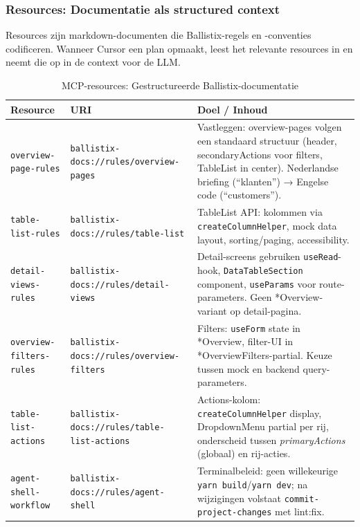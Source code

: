 \subsubsection{Resources: Documentatie als structured context}

Resources zijn markdown-documenten die Ballistix-regels en -conventies codificeren. Wanneer Cursor een plan opmaakt, leest het relevante resources in en neemt die op in de context voor de LLM.

\begin{table}[htbp]
  \centering
  \caption{MCP-resources: Gestructureerde Ballistix-documentatie}
  \label{tab:mcp-resources}
  \small
  \begin{tabularx}{\textwidth}{|l|l|X|}
    \hline
    \textbf{Resource} & \textbf{URI} & \textbf{Doel / Inhoud} \\
    \hline
    \texttt{overview-page-rules} & 
    \texttt{ballistix-docs://rules/overview-pages} &
    Vastleggen: overview-pages volgen een standaard structuur (header, secondaryActions voor filters, TableList in center). Nederlandse briefing (``klanten'') → Engelse code (``customers''). \\
    \hline
    \texttt{table-list-rules} &
    \texttt{ballistix-docs://rules/table-list} &
    TableList API: kolommen via \texttt{createColumnHelper}, mock data layout, sorting/paging, accessibility. \\
    \hline
    \texttt{detail-views-rules} &
    \texttt{ballistix-docs://rules/detail-views} &
    Detail-screens gebruiken \texttt{useRead}-hook, \texttt{DataTableSection} component, \texttt{useParams} voor route-parameters. Geen *Overview-variant op detail-pagina. \\
    \hline
    \texttt{overview-filters-rules} &
    \texttt{ballistix-docs://rules/overview-filters} &
    Filters: \texttt{useForm} state in *Overview, filter-UI in *OverviewFilters-partial. Keuze tussen mock en backend query-parameters. \\
    \hline
    \texttt{table-list-actions} &
    \texttt{ballistix-docs://rules/table-list-actions} &
    Actions-kolom: \texttt{createColumnHelper} display, DropdownMenu partial per rij, onderscheid tussen \textit{primaryActions} (globaal) en rij-acties. \\
    \hline
    \texttt{agent-shell-workflow} &
    \texttt{ballistix-docs://rules/agent-shell} &
    Terminalbeleid: geen willekeurige \texttt{yarn build}/\texttt{yarn dev}; na wijzigingen volstaat \texttt{commit-project-changes} met lint:fix. \\
    \hline
  \end{tabularx}
\end{table}

